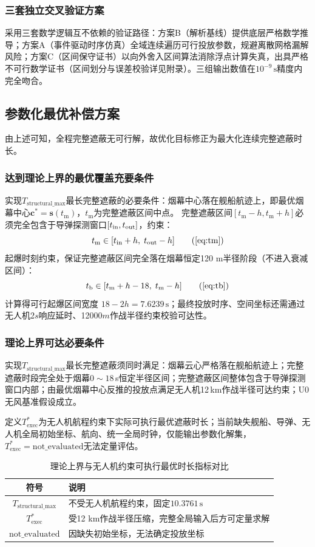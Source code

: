 \documentclass[withoutpreface,bwprint]{cumcmthesis}
\renewcommand{\textbf}[1]{{\song\bfseries #1}}
\begin{document}
\subsubsection{三套独立交叉验证方案}
采用三套数学逻辑互不依赖的验证路径：方案B（解析基线）提供底层严格数学推导；方案A（事件驱动时序仿真）全域连续遍历可行投放参数，规避离散网格漏解风险；方案C（区间保守证书）以向外舍入区间算法消除浮点计算失真，出具严格不可行数学证书（区间划分与误差校验详见附录）。三组输出数值在$10^{-9}\,\text{s}$精度内完全吻合。

\subsection{参数化最优补偿方案}
由上述可知，全程完整遮蔽无可行解，故优化目标修正为最大化连续完整遮蔽时长。

\subsubsection{达到理论上界的最优覆盖充要条件}
实现$T_{\text{structural\_max}}$最长完整遮蔽的必要条件：烟幕中心落在舰船航迹上，即最优烟幕中心$\bm{c}^*=\bm{s}(t_{\mathrm{m}})$，$t_{\mathrm{m}}$为完整遮蔽区间中点。
完整遮蔽区间$[t_{\mathrm{m}}-h,t_{\mathrm{m}}+h]$必须完全包含于导弹探测窗口$[t_{\rm in},t_{\rm out}]$，约束：
\[
t_{\mathrm{m}}\in [t_{\rm in}+h,\;t_{\rm out}-h] \tag{\ref{eq:tm}}
\]
起爆时刻约束，保证完整遮蔽区间完全落在烟幕恒定120 m半径阶段（不进入衰减区间）：
\[
t_{\mathrm{b}}\in [t_{\mathrm{m}}+h-18,\;t_{\mathrm{m}}-h] \tag{\ref{eq:tb}}
\]
计算得可行起爆区间宽度 $18-2h=7.6239\,\text{s}$；最终投放时序、空间坐标还需通过无人机2\(s\)响应延时、12000\(m\)作战半径约束校验可达性。


\subsubsection{理论上界可达必要条件}
实现$T_{\text{structural\_max}}$最长完整遮蔽须同时满足：烟幕云心严格落在舰船航迹上；完整遮蔽时段完全处于烟幕$0\sim18$\,s恒定半径区间；完整遮蔽区间整体包含于导弹探测窗口内部；由最优烟幕中心反推的投放点满足无人机12\,km作战半径可达约束；U0无风基准假设成立。

定义$T_{\text{exec}}^*$为无人机航程约束下实际可执行最优遮蔽时长；当前缺失舰船、导弹、无人机全局初始坐标、航向、统一全局时钟，仅能输出参数化解集，$T_{\text{exec}}^*=\text{not\_evaluated}$无法定量评估。

\begin{table}[htbp]
	\centering
	\caption{理论上界与无人机约束可执行最优时长指标对比}
	\label{tab:t_compare}
	\begin{tabularx}{\textwidth}{c l}
		\toprule
		\textbf{符号} & \textbf{说明} \\
		\midrule
		 $T_{\text{structural\_max}}$ & 不受无人机航程约束，固定$10.3761\,\text{s}$ \\
		$T_{\text{exec}}^*$ & 受12 km作战半径压缩，完整全局输入后方可定量求解 \\
		$\text{not\_evaluated}$ & 因缺失初始坐标，无法确定投放坐标 \\
		\bottomrule
	\end{tabularx}
\end{table}
\end{document}
